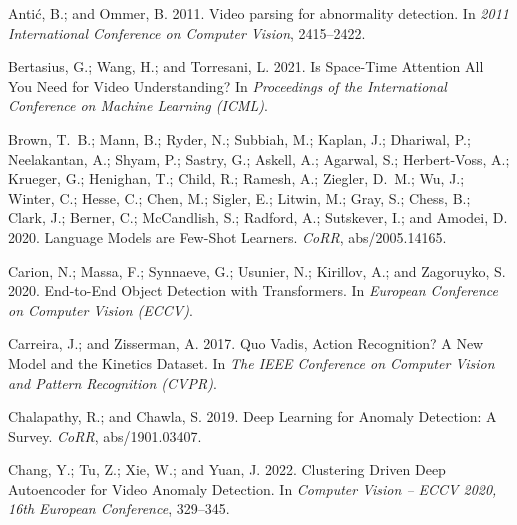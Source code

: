 \documentclass[letterpaper]{article} \usepackage{aaai23}  \usepackage{times}  \usepackage{helvet}  \usepackage{courier}  \usepackage[hyphens]{url}  \usepackage{graphicx} \urlstyle{rm} \def\UrlFont{\rm}  \usepackage{natbib}  \usepackage{caption} \frenchspacing  \setlength{\pdfpagewidth}{8.5in}  \setlength{\pdfpageheight}{11in}  \usepackage{algorithm}
\begin{document}
\begin{thebibliography}{50}
\providecommand{\natexlab}[1]{#1}

Antić, B.; and Ommer, B. 2011.
\newblock Video parsing for abnormality detection.
\newblock In \emph{2011 International Conference on Computer Vision},
  2415--2422.

Bertasius, G.; Wang, H.; and Torresani, L. 2021.
\newblock Is Space-Time Attention All You Need for Video Understanding?
\newblock In \emph{Proceedings of the International Conference on Machine
  Learning (ICML)}.

Brown, T.~B.; Mann, B.; Ryder, N.; Subbiah, M.; Kaplan, J.; Dhariwal, P.;
  Neelakantan, A.; Shyam, P.; Sastry, G.; Askell, A.; Agarwal, S.;
  Herbert{-}Voss, A.; Krueger, G.; Henighan, T.; Child, R.; Ramesh, A.;
  Ziegler, D.~M.; Wu, J.; Winter, C.; Hesse, C.; Chen, M.; Sigler, E.; Litwin,
  M.; Gray, S.; Chess, B.; Clark, J.; Berner, C.; McCandlish, S.; Radford, A.;
  Sutskever, I.; and Amodei, D. 2020.
\newblock Language Models are Few-Shot Learners.
\newblock \emph{CoRR}, abs/2005.14165.

Carion, N.; Massa, F.; Synnaeve, G.; Usunier, N.; Kirillov, A.; and Zagoruyko,
  S. 2020.
\newblock End-to-End Object Detection with Transformers.
\newblock In \emph{European Conference on Computer Vision (ECCV)}.

Carreira, J.; and Zisserman, A. 2017.
\newblock Quo Vadis, Action Recognition? {A} New Model and the Kinetics
  Dataset.
\newblock In \emph{The IEEE Conference on Computer Vision and Pattern
  Recognition (CVPR)}.

Chalapathy, R.; and Chawla, S. 2019.
\newblock Deep Learning for Anomaly Detection: {A} Survey.
\newblock \emph{CoRR}, abs/1901.03407.

Chang, Y.; Tu, Z.; Xie, W.; and Yuan, J. 2022.
\newblock Clustering Driven Deep Autoencoder for Video Anomaly Detection.
\newblock In \emph{Computer Vision – ECCV 2020, 16th European Conference},
  329--345.


\end{thebibliography}
\end{document}
